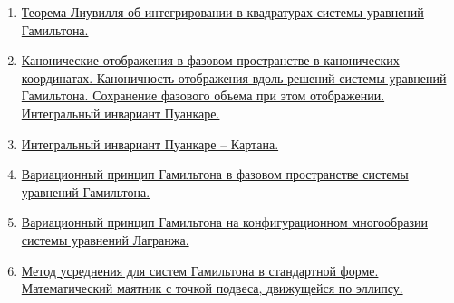 \documentclass[specialist, subf, href, colorlinks=true, 12pt, times, mtpro, final]{disser}
\theoremstyle{definition}
\begin{document}
\begin{enumerate}
    \item \hyperref[21]{Теорема Лиувилля об интегрировании в квадратурах системы уравнений Гамильтона.}
    \item \hyperref[22]{Канонические отображения в фазовом пространстве в канонических координатах. Каноничность отображения вдоль решений системы уравнений Гамильтона. Сохранение фазового объема при этом отображении. Интегральный инвариант Пуанкаре.}
    \item \hyperref[23]{Интегральный инвариант Пуанкаре – Картана.}
    \item \hyperref[24]{Вариационный принцип Гамильтона в фазовом пространстве системы уравнений Гамильтона.}
    \item \hyperref[25]{Вариационный принцип Гамильтона на конфигурационном многообразии системы уравнений Лагранжа.}
    \item \hyperref[26]{Метод усреднения для систем Гамильтона в стандартной форме. Математический маятник с точкой подвеса, движущейся по эллипсу.}
    \end{enumerate}
\end{document}

